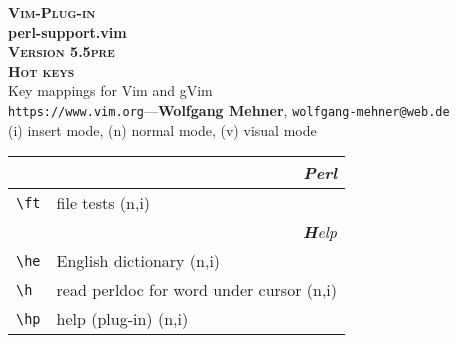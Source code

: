\documentclass[oneside,10pt,landscape,DIV17]{scrartcl}
\newcommand{\Pluginversion}{5.5pre}
\begin{document}
%

\begin{multicols}{3}
%
\begin{center}
%
\textbf{\textsc{\small{Vim-Plug-in}}}\\
\textbf{\LARGE{perl-support.vim}}\\
\textbf{\textsc{\small{Version \Pluginversion}}}\\
\vspace{1mm}%
\textbf{\textsc{\Huge{Hot keys}}}\\ 
\vspace{1mm}%
Key mappings for Vim and gVim\\
{\tiny  \texttt{https://www.vim.org}\hspace{1.5mm}---\hspace{1.5mm}\textbf{Wolfgang Mehner},  \texttt{wolfgang-mehner@web.de}}\\
\vspace{1.0mm}
{\normalsize (i)} insert mode, {\normalsize (n)} normal mode, {\normalsize (v)} visual mode\\
\vspace{1.0mm}
%
\begin{tabular}[]{|p{11mm}|p{60mm}|}
\hline 
\multicolumn{2}{|r|}{\textsl{\textbf{P}erl}}\\[1.0ex]
\hline \verb'\ft'    & file tests                      \hfill (n,i)\\
\hline 
\hline 
\multicolumn{2}{|r|}{\textsl{\textbf{H}elp}}\\[1.0ex]
\hline \verb'\he'   & English dictionary                 \hfill (n,i)\\
\hline \verb'\h'    & read perldoc for word under cursor \hfill (n,i)\\
\hline \verb'\hp'   & help (plug-in) \hfill (n,i)\\
\hline 

\end{tabular}
\end{center}
\end{multicols}
\end{document}
